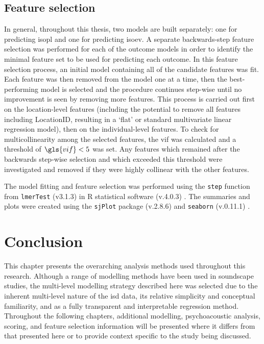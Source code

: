  \subsection{Feature selection}
 \label{sec:featureSelection}
In general, throughout this thesis, two models are built separately: one for predicting \gls{isopl} and one for predicting \gls{isoev}. A separate backwards-step feature selection was performed for each of the outcome models in order to identify the minimal feature set to be used for predicting each outcome. In this feature selection process, an initial model containing all of the candidate features was fit. Each feature was then removed from the model one at a time, then the best-performing model is selected and the procedure continues step-wise until no improvement is seen by removing more features. This process is carried out first on the location-level features (including the potential to remove all features including LocationID, resulting in a `flat' or standard multivariate linear regression model), then on the individual-level features.  To check for multicollinearity among the selected features, the \gls{vif} was calculated and a threshold of $\gls{vif} < 5$ was set. Any features which remained after the backwards step-wise selection and which exceeded this threshold were investigated and removed if they were highly collinear with the other features.

The model fitting and feature selection was performed using the \texttt{step} function from \texttt{lmerTest} (v3.1.3) \citep{Kuznetsova2017lmerTest} in R statistical software (v.4.0.3) \citep{RCT2018R}. The summaries and plots were created using the \texttt{sjPlot} package (v.2.8.6) \citep{Luedecke2021sjPlot} and \texttt{seaborn} (v.0.11.1) \citep{Waskom2021seaborn}.

\section{Conclusion}
This chapter presents the overarching analysis methods used throughout this research. Although a range of modelling methods have been used in soundscape studies, the multi-level modelling strategy described here was selected due to the inherent multi-level nature of the \gls{isd} data, its relative simplicity and conceptual familiarity, and as a fully transparent and interpretable regression method. Throughout the following chapters, additional modelling, psychoacoustic analysis, scoring, and feature selection information will be presented where it differs from that presented here or to provide context specific to the study being discussed.


